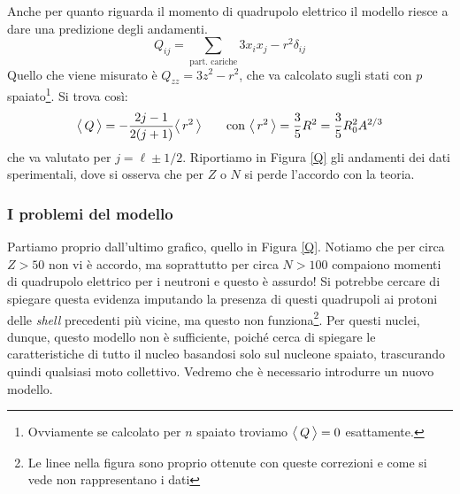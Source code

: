 \noindent Anche per quanto riguarda il momento di quadrupolo elettrico il modello riesce a dare una predizione degli andamenti.
$$Q_{ij} = \sum_\text{part. cariche} 3x_ix_j -r^2\delta_{ij}$$
Quello che viene misurato è $Q_{zz} = 3z^2 - r^2$, che va calcolato sugli stati con $p$ spaiato\footnote{Ovviamente se calcolato per $n$ spaiato troviamo $\bigl\langle\, Q\, \bigr\rangle = 0$ esattamente.}. Si trova così:
$$\bigl\langle\, Q\, \bigr\rangle = -\frac{2j-1}{2(j+1)}\bigl\langle\, r^2\, \bigr\rangle\qquad \text{con } \bigl\langle\, r^2\, \bigr\rangle = \frac{3}{5}R^2 =\frac{3}{5}R_0^2A^{2/3}$$
che va valutato per $j=\ell\pm 1/2$. Riportiamo in Figura \ref{Q} gli andamenti dei dati sperimentali, dove si osserva che per $Z$ o $N$  si perde l'accordo con la teoria.



\subsubsection{I problemi del modello} Partiamo proprio dall'ultimo grafico, quello in Figura \ref{Q}. Notiamo che per circa $Z>50$ non vi è accordo, ma soprattutto per circa $N>100$ compaiono momenti di quadrupolo elettrico per i neutroni e questo è assurdo! Si potrebbe cercare di spiegare questa evidenza imputando la presenza di questi quadrupoli ai protoni delle \textit{shell} precedenti più vicine, ma questo non funziona\footnote{Le linee nella figura sono proprio ottenute con queste correzioni e come si vede non rappresentano i dati}. Per questi nuclei, dunque, questo modello non è sufficiente, poiché cerca di spiegare le caratteristiche di tutto il nucleo basandosi solo sul nucleone spaiato, trascurando quindi qualsiasi moto collettivo. Vedremo che è necessario introdurre un nuovo modello.

